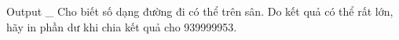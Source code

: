 Output
\_ Cho biết số dạng đường đi có thể trên sân. Do kết quả có thể rất lớn, hãy in phần dư khi chia kết quả cho 939999953.